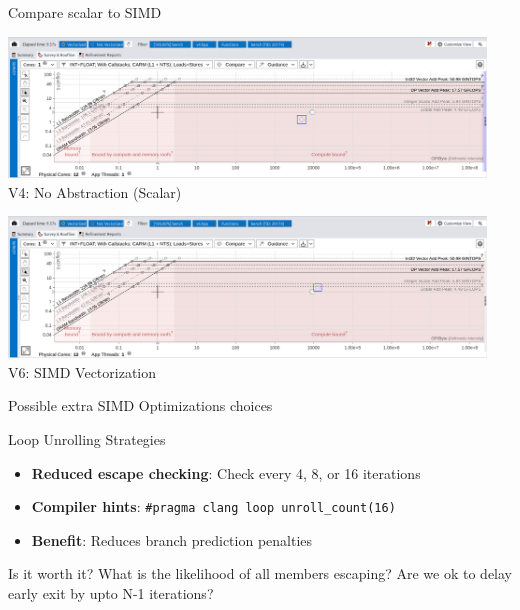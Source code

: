 \documentclass{beamer}
\begin{document}
\begin{frame}{Compare scalar to SIMD}

            \centering
            \includegraphics[width=0.95\textwidth]{images/V4_roofline.png}
            \\
            \footnotesize V4: No Abstraction (Scalar)


            \centering
            \includegraphics[width=0.95\textwidth]{images/V6_roofline.png}
            \\
            \footnotesize V6: SIMD Vectorization


\end{frame}


\begin{frame}{Possible extra SIMD Optimizations choices}
    \begin{block}{Loop Unrolling Strategies}
        \begin{itemize}
            \item \textbf{Reduced escape checking}: Check every 4, 8, or 16 iterations
            \item \textbf{Compiler hints}: \texttt{\#pragma clang loop unroll\_count(16)}
            \item \textbf{Benefit}: Reduces branch prediction penalties
        \end{itemize}
    \end{block}

    \begin{alertblock}{Is it worth it?}
        What is the likelihood of all members escaping?
        Are we ok to delay early exit by upto N-1 iterations?
    \end{alertblock}
\end{frame}
\end{document}
